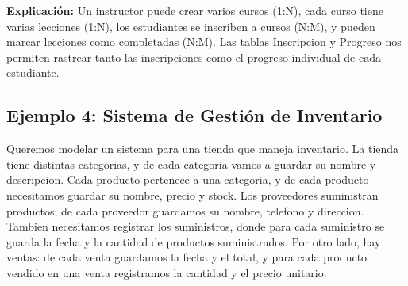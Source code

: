 \documentclass[12pt]{article}
\begin{document}
\begin{center}
{
}
\end{center}

\textbf{Explicación:} Un instructor puede crear varios cursos (1:N), cada curso tiene varias lecciones (1:N), los estudiantes se inscriben a cursos (N:M), y pueden marcar lecciones como completadas (N:M). Las tablas Inscripcion y Progreso nos permiten rastrear tanto las inscripciones como el progreso individual de cada estudiante.

\subsection{Ejemplo 4: Sistema de Gestión de Inventario}
Queremos modelar un sistema para una tienda que maneja inventario. La tienda tiene distintas categorias, y de cada categoria vamos a guardar su nombre y descripcion. Cada producto pertenece a una categoria, y de cada producto necesitamos guardar su nombre, precio y stock. Los proveedores suministran productos; de cada proveedor guardamos su nombre, telefono y direccion. Tambien necesitamos registrar los suministros, donde para cada suministro se guarda la fecha y la cantidad de productos suministrados. Por otro lado, hay ventas: de cada venta guardamos la fecha y el total, y para cada producto vendido en una venta registramos la cantidad y el precio unitario.
\end{document}
